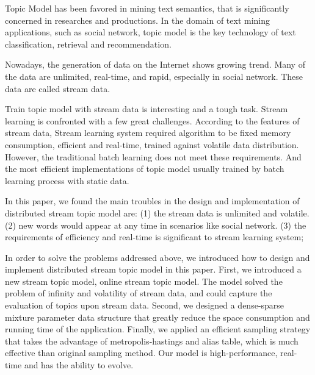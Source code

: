 \begin{eabstract}
Topic Model has been favored in mining text semantics, 
that is significantly concerned in researches and productions. 
In the domain of text mining applications, such as social network,
topic model is the key technology of text classification, retrieval and recommendation.

Nowadays, the generation of data on the Internet shows growing trend. 
Many of the data are unlimited, real-time, and rapid, especially in social network. 
These data are called stream data.

Train topic model with stream data is interesting and a tough task.
Stream learning is confronted with a few great challenges. According to the features of stream data, 
Stream learning system required algorithm to be fixed memory consumption, efficient and real-time, trained against volatile data distribution.
However, the traditional batch learning does not meet these requirements.
And the most efficient implementations of topic model usually trained by batch learning process with static data.

In this paper, we found the main troubles in the design and implementation of distributed stream topic model are:
(1) the stream data is unlimited and volatile.
(2) new words would appear at any time in scenarios like social network.
(3) the requirements of efficiency and real-time is significant to stream learning system;

In order to solve the problems addressed above, we introduced how to design and implement distributed stream topic model in this paper.
First, we introduced a new stream topic model, online stream topic model.
The model solved the problem of infinity and volatility of stream data, and could capture the evaluation of topics upon stream data.
Second, we designed a dense-sparse mixture parameter data structure that greatly reduce the space consumption and running time of the application.
Finally, we applied an efficient sampling strategy that takes the advantage of metropolis-hastings and alias table, 
which is much effective than original sampling method.
Our model is high-performance, real-time and has the ability to evolve.

\end{eabstract}

